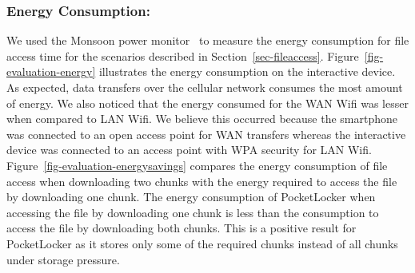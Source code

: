 \subsubsection{Energy Consumption:\space} We used the Monsoon power
monitor~\cite{monsoon} to measure the energy consumption for file access time
for the scenarios described in Section~\ref{sec-fileaccess}.
Figure~\ref{fig-evaluation-energy} illustrates the energy consumption on the
interactive device. As expected, data transfers over the cellular network
consumes the most amount of energy. We also noticed that the energy consumed
for the WAN Wifi was lesser when compared to LAN Wifi. We believe this
occurred because the smartphone was connected to an open access point for WAN
transfers whereas the interactive device was connected to an access point
with WPA security for LAN Wifi. Figure~\ref{fig-evaluation-energysavings}
compares the energy consumption of file access when downloading two chunks
with the energy required to access the file by downloading one chunk. The
energy consumption of PocketLocker when accessing the file by downloading one
chunk is less than the consumption to access the file by downloading both
chunks. This is a positive result for PocketLocker as it stores only some of
the required chunks instead of all chunks under storage pressure.

